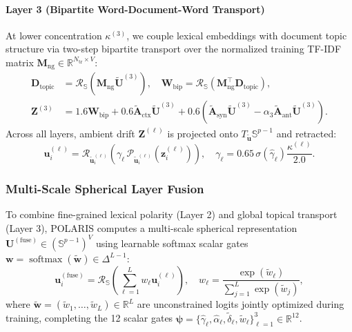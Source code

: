 \documentclass[journal]{IEEEtran}
\begin{document}
\paragraph{Layer 3 (Bipartite Word-Document-Word Transport)}
At lower concentration $\kappa^{(3)}$, we couple lexical embeddings with document topic structure via two-step bipartite transport over the normalized training TF-IDF matrix $\mathbf{M}_{\text{ng}} \in \mathbb{R}^{N_{\text{tr}} \times V}$:
\begin{align}
\mathbf{D}_{\text{topic}} &= \mathcal{R}_{\mathbb{S}}\!\left(\mathbf{M}_{\text{ng}}\tilde{\mathbf{U}}^{(3)}\right), \quad \mathbf{W}_{\text{bip}} = \mathcal{R}_{\mathbb{S}}\!\left(\mathbf{M}_{\text{ng}}^\top \mathbf{D}_{\text{topic}}\right), \label{eq:bip_transport} \\
\mathbf{Z}^{(3)} &= 1.6\mathbf{W}_{\text{bip}} + 0.6\tilde{\mathbf{A}}_{\text{ctx}}\tilde{\mathbf{U}}^{(3)} + 0.6\left(\tilde{\mathbf{A}}_{\text{syn}}\tilde{\mathbf{U}}^{(3)} - \alpha_3\tilde{\mathbf{A}}_{\text{ant}}\tilde{\mathbf{U}}^{(3)}\right). \label{eq:layer3_drift}
\end{align}
Across all layers, ambient drift $\mathbf{Z}^{(\ell)}$ is projected onto $T_{\tilde{\mathbf{u}}}\mathbb{S}^{p-1}$ and retracted:
\begin{equation}
\mathbf{u}_i^{(\ell)} = \mathcal{R}_{\tilde{\mathbf{u}}_i^{(\ell)}}\!\left(\gamma_\ell \, \mathcal{P}_{\tilde{\mathbf{u}}_i^{(\ell)}}\!\left(\mathbf{z}_i^{(\ell)}\right)\right), \quad \gamma_\ell = 0.65\,\sigma(\hat{\gamma}_\ell)\frac{\kappa^{(\ell)}}{2.0}.
\label{eq:layer_update}
\end{equation}

\subsubsection{Multi-Scale Spherical Layer Fusion}
To combine fine-grained lexical polarity (Layer 2) and global topical transport (Layer 3), POLARIS computes a multi-scale spherical representation $\mathbf{U}^{(\text{fuse})} \in (\mathbb{S}^{p-1})^V$ using learnable softmax scalar gates $\mathbf{w} = \operatorname{softmax}(\tilde{\mathbf{w}}) \in \Delta^{L-1}$:
\begin{equation}
\mathbf{u}_i^{(\text{fuse})} = \mathcal{R}_{\mathbb{S}}\!\left(\sum_{\ell=1}^L w_\ell \mathbf{u}_i^{(\ell)}\right), \quad w_\ell = \frac{\exp(\tilde{w}_\ell)}{\sum_{j=1}^L \exp(\tilde{w}_j)},
\label{eq:multiscale_fusion}
\end{equation}
where $\tilde{\mathbf{w}} = (\tilde{w}_1, \dots, \tilde{w}_L) \in \mathbb{R}^L$ are unconstrained logits jointly optimized during training, completing the 12 scalar gates $\boldsymbol{\psi} = \{\hat{\gamma}_\ell, \hat{\alpha}_\ell, \tilde{\delta}_\ell, \tilde{w}_\ell\}_{\ell=1}^3 \in \mathbb{R}^{12}$.
\end{document}
